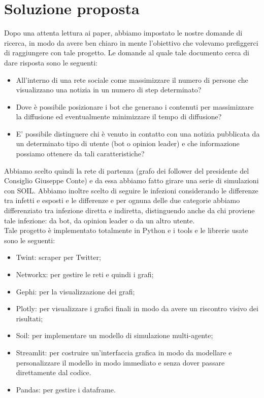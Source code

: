 \section{Soluzione proposta}
Dopo una attenta lettura ai paper, abbiamo impostato le nostre domande di ricerca, in modo da avere ben chiaro in mente l'obiettivo che volevamo prefiggerci di raggiungere con tale progetto. Le domande al quale tale documento cerca di dare risposta sono le seguenti:
\begin{itemize}
  \item All'interno di una rete sociale come massimizzare il numero di persone che visualizzano una notizia in un numero di step determinato?
  \item Dove è possibile posizionare i bot che generano i contenuti per massimizzare la diffusione ed eventualmente minimizzare il tempo di diffusione?
  \item E' possibile distinguere chi è venuto in contatto con una notizia pubblicata da un determinato tipo di utente (bot o opinion leader) e che informazione possiamo ottenere da tali caratteristiche?
\end{itemize}
Abbiamo scelto quindi la rete di partenza (grafo dei follower del presidente del Consiglio Giuseppe Conte) e da essa abbiamo fatto girare una serie di simulazioni con SOIL. Abbiamo inoltre scelto di seguire le infezioni considerando le differenze tra infetti e esposti e le differenze e per ognuna delle due categorie abbiamo differenziato tra infezione diretta e indiretta, distinguendo anche da chi proviene tale infezione: da bot, da opinion leader o da un altro utente.
\\
Tale progetto è implementato totalmente in Python e i tools e le librerie usate sono le seguenti:
\begin{itemize}
\item Twint: scraper per Twitter;
\item Networkx: per gestire le reti e quindi i grafi;
\item Gephi: per la visualizzazione dei grafi;
\item Plotly: per visualizzare i grafici finali in modo da avere un riscontro visivo dei risultati;
\item Soil: per implementare un modello di simulazione multi-agente;
\item Streamlit: per costruire un'interfaccia grafica in modo da modellare e personalizzare il modello in modo immediato e senza dover passare direttamente dal codice.
\item Pandas: per gestire i dataframe.
\end{itemize}

